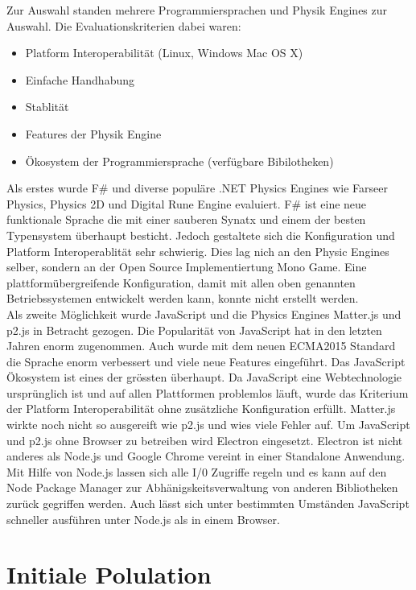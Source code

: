     Zur Auswahl standen mehrere Programmiersprachen und Physik Engines zur Auswahl. Die Evaluationskriterien dabei waren:
    \begin{itemize}
      \item Platform Interoperabilität (Linux, Windows Mac OS X)
      \item Einfache Handhabung
      \item Stablität
      \item Features der Physik Engine
      \item Ökosystem der Programmiersprache (verfügbare Bibilotheken)
    \end{itemize}

     Als erstes wurde F\# und diverse populäre .NET Physics Engines wie Farseer Physics, Physics 2D und Digital Rune Engine evaluiert.
     F\# ist eine neue funktionale Sprache die mit einer sauberen Synatx und einem der besten Typensystem überhaupt besticht.
     Jedoch gestaltete sich die Konfiguration und Platform Interoperablität sehr schwierig. Dies lag nich an den Physic Engines selber,
     sondern an der Open Source Implementiertung Mono Game. Eine plattformübergreifende Konfiguration,
     damit mit allen oben genannten Betriebssystemen entwickelt werden kann, konnte nicht erstellt werden.\\
     Als zweite Möglichkeit wurde JavaScript und die Physics Engines Matter.js und p2.js in Betracht gezogen.
     Die Popularität von JavaScript hat in den letzten Jahren enorm zugenommen.
     Auch wurde mit dem neuen ECMA2015 Standard die Sprache enorm verbessert und viele neue Features eingeführt. Das JavaScript Ökosystem ist eines der grössten überhaupt.
     Da JavaScript eine Webtechnologie ursprünglich ist und auf allen Plattformen problemlos läuft, wurde das Kriterium der Platform Interoperabilität ohne zusätzliche Konfiguration erfüllt.
     Matter.js wirkte noch nicht so ausgereift wie p2.js und wies viele Fehler auf. Um JavaScript und p2.js ohne Browser zu betreiben wird Electron eingesetzt.
     Electron ist nicht anderes als Node.js und Google Chrome vereint in einer Standalone Anwendung.
     Mit Hilfe von Node.js lassen sich alle I/0 Zugriffe regeln und es kann auf den Node Package Manager zur Abhänigskeitsverwaltung von anderen Bibliotheken zurück gegriffen werden.
     Auch lässt sich unter bestimmten Umständen JavaScript schneller ausführen unter Node.js als in einem Browser.

  \section{Initiale Polulation\label{sec:Initiale Polulation}}

